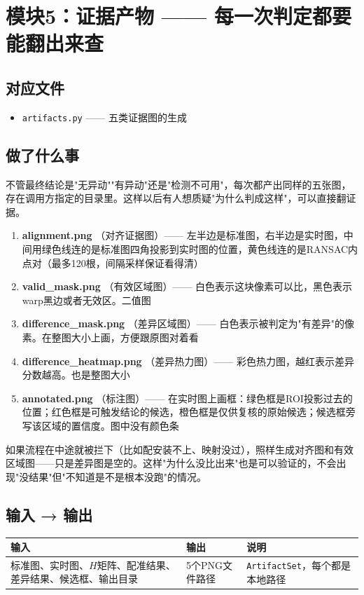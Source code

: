 \documentclass[12pt,a4paper]{ctexart}
\begin{document}
\section{模块5：证据产物 —— 每一次判定都要能翻出来查}

\subsection*{对应文件}
\begin{itemize}
\item \texttt{artifacts.py} —— 五类证据图的生成
\end{itemize}

\subsection*{做了什么事}

不管最终结论是"无异动""有异动"还是"检测不可用"，每次都产出同样的五张图，存在调用方指定的目录里。这样以后有人想质疑"为什么判成这样"，可以直接翻证据。

\begin{enumerate}
\item \textbf{alignment.png} （对齐证据图）—— 左半边是标准图，右半边是实时图，中间用绿色线连的是标准图四角投影到实时图的位置，黄色线连的是RANSAC内点对（最多120根，间隔采样保证看得清）
\item \textbf{valid\_mask.png} （有效区域图）—— 白色表示这块像素可以比，黑色表示warp黑边或者无效区。二值图
\item \textbf{difference\_mask.png} （差异区域图）—— 白色表示被判定为"有差异"的像素。在整图大小上画，方便跟原图对着看
\item \textbf{difference\_heatmap.png} （差异热力图）—— 彩色热力图，越红表示差异分数越高。也是整图大小
\item \textbf{annotated.png} （标注图）—— 在实时图上画框：绿色框是ROI投影过去的位置；红色框是可触发结论的候选，橙色框是仅供复核的原始候选；候选框旁写该区域的置信度。图中没有颜色条
\end{enumerate}

如果流程在中途就被拦下（比如配安装不上、映射没过），照样生成对齐图和有效区域图——只是差异图是空的。这样"为什么没比出来"也是可以验证的，不会出现"没结果"但"不知道是不是根本没跑"的情况。

\subsection*{输入 → 输出}
\noindent\begin{tabular}{|p{4cm}|p{4cm}|p{5cm}|}
\hline
\textbf{输入} & \textbf{输出} & \textbf{说明} \\
\hline
标准图、实时图、$H$矩阵、配准结果、差异结果、候选框、输出目录 & 5个PNG文件路径 & \texttt{ArtifactSet}，每个都是本地路径 \\
\hline
\end{tabular}
\end{document}
